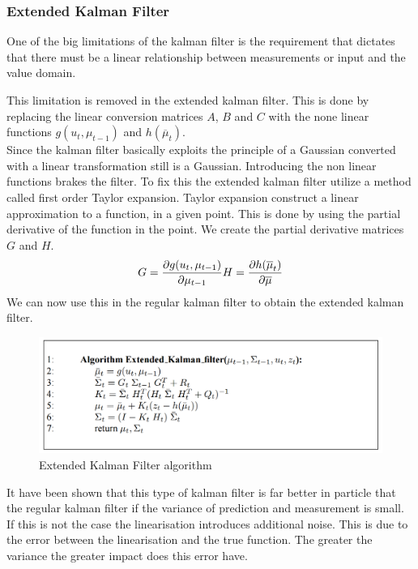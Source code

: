 \subsubsection{Extended Kalman Filter}
One of the big limitations of the kalman filter is the requirement that dictates that there must be a linear relationship between measurements or input and the value domain. 

This limitation is removed in the extended kalman filter. This is done by replacing the linear conversion matrices $A$, $B$ and $C$ with the none linear functions $g(u_t, \mu_{t-1})$ and $h(\overline{\mu}_t)$.\\

Since the kalman filter basically exploits the principle of a Gaussian converted with a linear transformation still is a Gaussian. Introducing the non linear functions brakes the filter. To fix this the extended kalman filter utilize a method called first order Taylor expansion. Taylor expansion construct a linear approximation to a function, in a given point. This is done by using the partial derivative of the function in the point. We create the partial derivative matrices $G$ and $H$.
\begin{equation}
G = \frac{\partial g(u_t, \mu_{t-1})}{\partial \mu_{t-1}} \\ H = \frac{\partial h(\overline{\mu}_t)}{\partial \overline{\mu}}
\end{equation}
We can now use this in the regular kalman filter to obtain the extended kalman filter.
\begin{figure}[H]
\centering
\includegraphics[scale=0.51]{billeder/EKF.png}
\caption{Extended Kalman Filter algorithm}
\end{figure}
It have been shown that this type of kalman filter is far better in particle that the regular kalman filter if the variance of prediction and measurement is small. If this is not the case the linearisation introduces additional noise. This is due to the error between the linearisation and the true function. The greater the variance the greater impact does this error have.  
